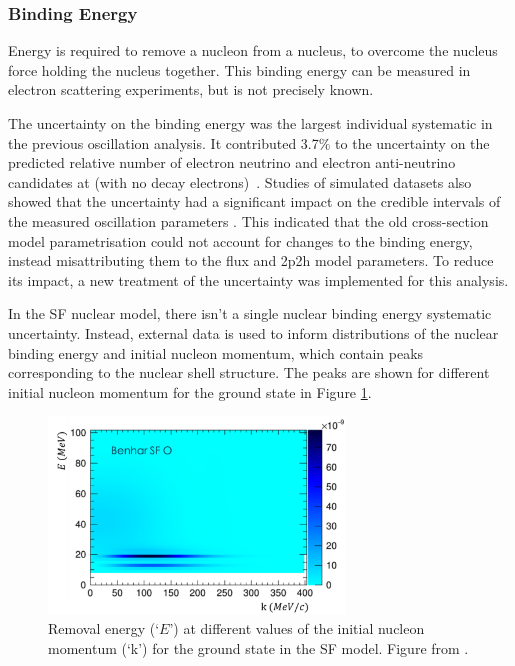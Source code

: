 \subsubsection{Binding Energy}\label{sec:eb}

Energy is required to remove a nucleon from a nucleus, to overcome the nucleus force holding the nucleus together. This binding energy can be measured in electron scattering experiments, but is not precisely known.

The uncertainty on the binding energy was the largest individual systematic in the previous oscillation analysis. It contributed 3.7$\%$ to the uncertainty on the predicted relative number of electron neutrino and electron anti-neutrino candidates at \SK (with no decay electrons)~\cite{t2knature}. Studies of simulated datasets also showed that the uncertainty had a significant impact on the credible intervals of the measured oscillation parameters \cite{tn331}. This indicated that the old cross-section model parametrisation could not account for changes to the binding energy, instead misattributing them to the flux and 2p2h model parameters. To reduce its impact, a new treatment of the uncertainty was implemented for this analysis.

In the SF nuclear model, there isn't a single nuclear binding energy systematic uncertainty. Instead, external data is used to inform distributions of the nuclear binding energy and initial nucleon momentum, which contain peaks corresponding to the nuclear shell structure. The peaks are shown for different initial nucleon momentum for the ground state in Figure \ref{fig:sfshells}.

\begin{figure}
\centering
\includegraphics*[width=0.7\textwidth,clip]{figs/SFShells}
\caption{Removal energy (`$E$') at different values of the initial nucleon momentum (`k') for the ground state in the SF model. Figure from \cite{tn344}.}\label{fig:sfshells}
\end{figure}


